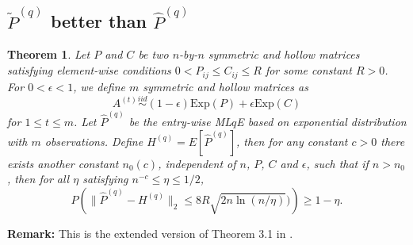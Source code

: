 \documentclass[a4paper]{article}
\newtheorem{theorem}[fact]{Theorem}
\begin{document}
\subsection{$\widetilde{P}^{(q)}$ better than $\hat{P}^{(q)}$}


\begin{theorem}
\label{thm:PqDiff}
Let $P$ and $C$ be two $n$-by-$n$ symmetric and hollow matrices satisfying element-wise conditions $0 < P_{ij} \le C_{ij} \le R$ for some constant $R > 0$. For $0 < \epsilon < 1$, we define $m$ symmetric and hollow matrices as
\[
	A^{(t)} \stackrel{iid}{\sim} (1-\epsilon) \mathrm{Exp}(P) + \epsilon \mathrm{Exp}(C)
\]
for $1 \le t \le m$.
Let $\hat{P}^{(q)}$ be the entry-wise ML$q$E based on exponential distribution with $m$ observations.
Define $H^{(q)} = E[\hat{P}^{(q)}]$,
then for any constant $c > 0$ there exists another constant $n_0(c)$, independent of $n$, $P$, $C$ and $\epsilon$, such that if $n > n_0$, then for all $\eta$ satisfying $n^{-c} \le \eta \le 1/2$,
\[
	P \left( \| \hat{P}^{(q)} - H^{(q)} \|_2 \le 8 R \sqrt{2 n \ln(n/\eta)}) \right) \ge 1 - \eta.
\]
\end{theorem}
\textbf{Remark:} This is the extended version of Theorem 3.1 in \cite{oliveira2009concentration}.
\end{document}
